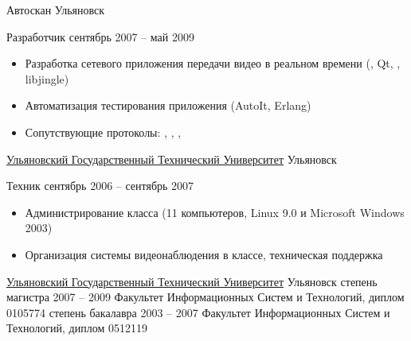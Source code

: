 \documentclass[unicode, 10pt, a4paper, oneside, fleqn]{article}
\begin{document}

\job
    {Автоскан}
    {Ульяновск}
    {
        \position
            {Разработчик}
            {сентябрь 2007 -- май 2009}
            {
                \begin{itemize}
                    \item{Разработка сетевого приложения передачи видео в реальном
                          времени (\CPP, Qt, , libjingle)}
                    \item{Автоматизация тестирования приложения (AutoIt, Erlang)}
                    \item{Сопутствующие протоколы: , , ,
                          }
                \end{itemize}
            }
    }



\job
    {\href{http://www.ulstu.ru}{Ульяновский Государственный Технический Университет}}
    {Ульяновск}
    {
        \position
            {Техник}
            {сентябрь 2006 -- сентябрь 2007}
            {
                \begin{itemize}
                    \item{Администрирование класса (11 компьютеров,
                           Linux 9.0 и Microsoft Windows 2003)}
                    \item{Организация системы видеонаблюдения в классе,
                          техническая поддержка}
                \end{itemize}
            }
    }

\newpage


\job
    {\href{http://www.ulstu.ru}{Ульяновский Государственный Технический Университет}}
    {Ульяновск}
    {
        \positionnobreak
            {степень магистра}
            {2007 -- 2009}
            {Факультет Информационных Систем и Технологий, диплом  0105774}
        \positionnobreak
            {степень бакалавра}
            {2003 -- 2007}
            {Факультет Информационных Систем и Технологий, диплом  0512119}
    }

\end{document}

